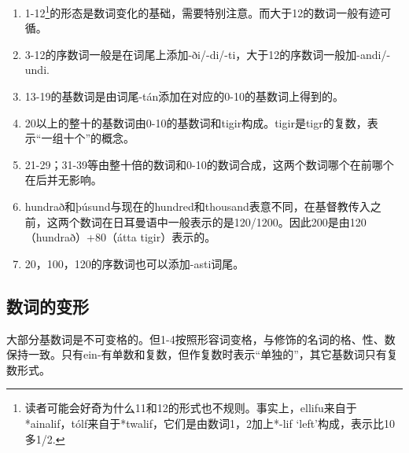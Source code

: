 \begin{enumerate}
  \def\labelenumi{\arabic{enumi})}
  \item
        1-12\footnote{读者可能会好奇为什么11和12的形式也不规则。事实上，ellifu来自于*ainalif，tólf来自于*twalif，它们是由数词1，2加上*-lif
          `left'构成，表示比10多1/2.}的形态是数词变化的基础，需要特别注意。而大于12的数词一般有迹可循。
  \item
        3-12的序数词一般是在词尾上添加-ði/-di/-ti，大于12的序数词一般加-andi/-undi.
  \item
        13-19的基数词是由词尾-tán添加在对应的0-10的基数词上得到的。
  \item
        20以上的整十的基数词由0-10的基数词和tigir构成。tigir是tigr的复数，表示``一组十个''的概念。
  \item
        21-29；31-39等由整十倍的数词和0-10的数词合成，这两个数词哪个在前哪个在后并无影响。
  \item
        hundrað和þúsund与现在的hundred和thousand表意不同，在基督教传入之前，这两个数词在日耳曼语中一般表示的是120/1200。因此200是由120（hundrað）+80（átta
        tigir）表示的。
  \item
        20，100，120的序数词也可以添加-asti词尾。
\end{enumerate}

\subsection{数词的变形}\label{ux6570ux8bcdux7684ux53d8ux5f62}

大部分基数词是不可变格的。但1-4按照形容词变格，与修饰的名词的格、性、数保持一致。只有ein-有单数和复数，但作复数时表示``单独的''，其它基数词只有复数形式。

